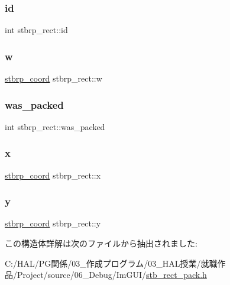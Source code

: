 \mbox{\label{structstbrp__rect_a92da8626bc99df041c0c3bfd01c25f7a}} 
\subsubsection{\texorpdfstring{id}{id}}
{\footnotesize\ttfamily int stbrp\+\_\+rect\+::id}

\mbox{\label{structstbrp__rect_a248d43f1eb979c1e7b92ba6df431dec5}} 
\subsubsection{\texorpdfstring{w}{w}}
{\footnotesize\ttfamily \mbox{\hyperlink{stb__rect__pack_8h_ac2c2491b95dea6a298b7423dc762dfd9}{stbrp\+\_\+coord}} stbrp\+\_\+rect\+::w}

\mbox{\label{structstbrp__rect_a74ba347755ce17f2f8a2ea66c612af49}} 
\subsubsection{\texorpdfstring{was\+\_\+packed}{was\_packed}}
{\footnotesize\ttfamily int stbrp\+\_\+rect\+::was\+\_\+packed}

\mbox{\label{structstbrp__rect_a4cc623a3e29f0bc0d3375f6645c84d18}} 
\subsubsection{\texorpdfstring{x}{x}}
{\footnotesize\ttfamily \mbox{\hyperlink{stb__rect__pack_8h_ac2c2491b95dea6a298b7423dc762dfd9}{stbrp\+\_\+coord}} stbrp\+\_\+rect\+::x}

\mbox{\label{structstbrp__rect_ae3034c1fbf86043b568f5a4dddf946fa}} 
\subsubsection{\texorpdfstring{y}{y}}
{\footnotesize\ttfamily \mbox{\hyperlink{stb__rect__pack_8h_ac2c2491b95dea6a298b7423dc762dfd9}{stbrp\+\_\+coord}} stbrp\+\_\+rect\+::y}



この構造体詳解は次のファイルから抽出されました\+:\begin{DoxyCompactItemize}
\item 
C\+:/\+H\+A\+L/\+P\+G関係/03\+\_\+作成プログラム/03\+\_\+\+H\+A\+L授業/就職作品/\+Project/source/06\+\_\+\+Debug/\+Im\+G\+U\+I/\mbox{\hyperlink{stb__rect__pack_8h}{stb\+\_\+rect\+\_\+pack.\+h}}\end{DoxyCompactItemize}
